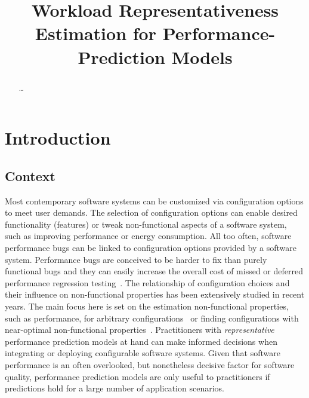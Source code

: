 \documentclass[conference]{IEEEtran}
\begin{document}
\title{Workload Representativeness Estimation for Performance-Prediction Models}

\author{

}
\maketitle

\begin{abstract}
\ldots
\end{abstract}


\section{Introduction}
\subsection{Context}
Most contemporary software systems can be customized via configuration options to meet user demands. The selection of configuration options can enable desired functionality (features) or tweak non-functional aspects of a software system, such as improving performance or energy consumption. All too often, software performance bugs can be linked to configuration options provided by a software system\cite{han_empirical_2016}. Performance bugs are conceived to be harder to fix than purely functional bugs and they can easily increase the overall cost of missed or deferred performance regression testing~\cite{molyneauxArtApplicationPerformance2015}. The relationship of configuration choices and their influence on non-functional properties has been extensively studied in recent years. The main focus here is set on the estimation non-functional properties, such as performance, for arbitrary configurations~\cite{siegmund_performance-influence_2015,haDeepPerf2019,guoVariabilityawarePerformancePrediction2013,guo_2018_data,sarkarCostEfficientSamplingPerformance} or finding configurations with near-optimal non-functional properties~\cite{nairUsingBadLearners2017,nairFlash18,ohFindingNearoptimalConfigurations2017}. Practitioners with \emph{representative} performance prediction models at hand can make informed decisions when integrating or deploying configurable software systems. Given that software performance is an often overlooked, but nonetheless decisive factor for software quality, performance prediction models are only useful to practitioners if predictions hold for a large number of application scenarios.
\end{document}
